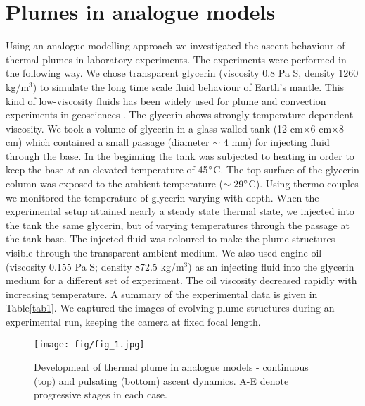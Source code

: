 \documentclass[12pt]{article}
\begin{document}
\section{Plumes in analogue models}
\label{sec2}

Using an analogue modelling approach we investigated the ascent behaviour of thermal plumes in laboratory experiments. The experiments were performed in the following way. We chose transparent glycerin (viscosity 0.8 Pa S, density 1260 kg/m$^3$) to simulate the long time scale fluid behaviour of Earth's mantle. This kind of low-viscosity fluids has been widely used for plume and convection experiments in geosciences \cite{bazarov2008experimental}. The glycerin shows strongly temperature dependent viscosity. We took a volume of glycerin in a glass-walled tank (12 cm$\times$6 cm$\times$8 cm) which contained a small passage (diameter $\sim$ 4 mm) for injecting fluid through the base. In the beginning the tank was subjected to heating in order to keep the base at an elevated temperature of 45$\degree$C. The top surface of the glycerin column was exposed to the ambient temperature ($\sim29\degree$C). Using thermo-couples we monitored the temperature of glycerin varying with depth. When the experimental setup attained nearly a steady state thermal state, we injected into the tank the same glycerin, but of varying temperatures through the passage at the tank base. The injected fluid was coloured to make the plume structures visible through the transparent ambient medium. We also used engine oil (viscosity 0.155 Pa S; density 872.5 kg/m$^3$) as an injecting fluid into the glycerin medium for a different set of experiment. The oil viscosity decreased rapidly with increasing temperature. A summary of the experimental data is given in Table\ref{tab1}. We captured the images of evolving plume structures during an experimental run, keeping the camera at fixed focal length.


\begin{figure}[!htb]
 \begin{center}
{\texttt{[image: fig/fig\_1.jpg]} }
\caption{ \small {Development of thermal plume in analogue models - continuous (top) and pulsating (bottom) ascent dynamics. 
A-E denote progressive stages in each case.}}
\label{fig:fig1}
 \end{center}
\end{figure}
\end{document}
